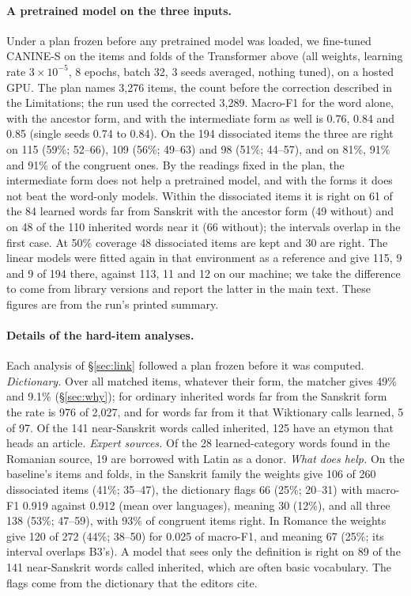\documentclass[11pt]{article}
\begin{document}
\paragraph{A pretrained model on the three inputs.} Under a plan frozen before any pretrained model was loaded, we fine-tuned CANINE-S \citep{clark2022canine} on the items and folds of the Transformer above (all weights, learning rate $3\times10^{-5}$, 8 epochs, batch 32, 3 seeds averaged, nothing tuned), on a hosted GPU. The plan names 3,276 items, the count before the correction described in the Limitations; the run used the corrected 3,289. Macro-F1 for the word alone, with the ancestor form, and with the intermediate form as well is 0.76, 0.84 and 0.85 (single seeds 0.74 to 0.84). On the 194 dissociated items the three are right on 115 (59\%; 52--66), 109 (56\%; 49--63) and 98 (51\%; 44--57), and on 81\%, 91\% and 91\% of the congruent ones. By the readings fixed in the plan, the intermediate form does not help a pretrained model, and with the forms it does not beat the word-only models. Within the dissociated items it is right on 61 of the 84 learned words far from Sanskrit with the ancestor form (49 without) and on 48 of the 110 inherited words near it (66 without); the intervals overlap in the first case. At 50\% coverage 48 dissociated items are kept and 30 are right. The linear models were fitted again in that environment as a reference and give 115, 9 and 9 of 194 there, against 113, 11 and 12 on our machine; we take the difference to come from library versions and report the latter in the main text. These figures are from the run's printed summary.

\paragraph{Details of the hard-item analyses.} Each analysis of \S\ref{sec:link} followed a plan frozen before it was computed. \textit{Dictionary.} Over all matched items, whatever their form, the matcher gives 49\% and 9.1\% (\S\ref{sec:why}); for ordinary inherited words far from the Sanskrit form the rate is 976 of 2,027, and for words far from it that Wiktionary calls learned, 5 of 97. Of the 141 near-Sanskrit words called inherited, 125 have an etymon that heads an article. \textit{Expert sources.} Of the 28 learned-category words found in the Romanian source, 19 are borrowed with Latin as a donor. \textit{What does help.} On the baseline's items and folds, in the Sanskrit family the weights give 106 of 260 dissociated items (41\%; 35--47), the dictionary flags 66 (25\%; 20--31) with macro-F1 0.919 against 0.912 (mean over languages), meaning 30 (12\%), and all three 138 (53\%; 47--59), with 93\% of congruent items right. In Romance the weights give 120 of 272 (44\%; 38--50) for 0.025 of macro-F1, and meaning 67 (25\%; its interval overlaps B3's). A model that sees only the definition is right on 89 of the 141 near-Sanskrit words called inherited, which are often basic vocabulary. The flags come from the dictionary that the editors cite.
\end{document}
